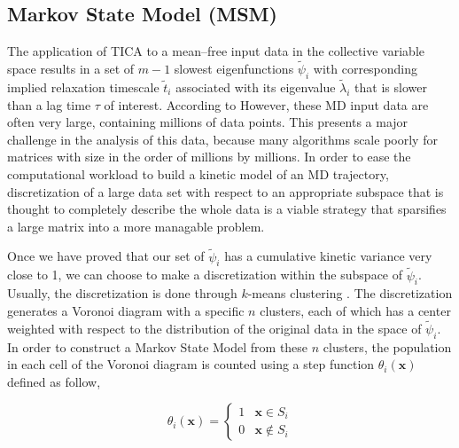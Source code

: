 \begin{spacing}{2.0}
    \section{Markov State Model (MSM)}

    The application of TICA to a mean--free input data in the collective variable space results in a set of $m-1$ slowest eigenfunctions $\tilde{\psi}_i$ 
    with corresponding implied relaxation timescale $\tilde{t}_i$ associated with its eigenvalue $\tilde{\lambda}_i$ that is slower than a lag time
    $\tau$ of interest. According to  However, these MD input data are often very large, containing millions of data points. This
    presents a major challenge in the analysis of this data, because many algorithms scale poorly for matrices with size in the order of millions by
    millions. In order to ease the computational workload to build a kinetic model of an MD trajectory, discretization of a large data set with respect
    to an appropriate subspace that is thought to completely describe the whole data is a viable strategy that sparsifies a large matrix into a more
    managable problem.

    Once we have proved that our set of $\tilde{\psi}_i$ has a cumulative kinetic variance very close to 1, we can choose to make a discretization
    within the subspace of $\tilde{\psi}_i$. Usually, the discretization is done through $k$-means clustering \cite{B-ML-Cambridge,B-MachineLearning-Murphy}.
    The discretization generates a Voronoi diagram with a specific $n$ clusters, each of which has a center weighted with respect to the distribution
    of the original data in the space of $\tilde{\psi}_i$. In order to construct a Markov State Model from these $n$ clusters, the population in each
    cell of the Voronoi diagram is counted using a step function $\theta_i(\mathbf{x})$ defined as follow,

    \begin{equation}
        \theta_i(\mathbf{x}) = \left\{
        \begin{array}{ll}
            1 & \mathbf{x} \in S_i \\
            0 & \mathbf{x} \not\in S_i
        \end{array}
        \right.
        \label{eq:step-function}
    \end{equation}


\end{spacing}
